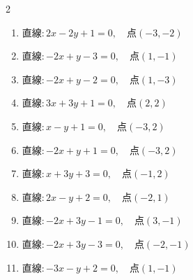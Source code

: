 \begin{multicols}{2}
\begin{enumerate}
  \item $直線:2x-2y+1=0,\quad 点 ( -3, -2 )$


\columnbreak %

  \item $直線:-2x+y-3=0,\quad 点 ( 1, -1 )$


  \item $直線:-2x+y-2=0,\quad 点 ( 1, -3 )$


  \item $直線:3x+3y+1=0,\quad 点 ( 2, 2 )$


  \item $直線:x-y+1=0,\quad 点 ( -3, 2 )$


  \item $直線:-2x+y+1=0,\quad 点 ( -3, 2 )$


  \item $直線:x+3y+3=0,\quad 点 ( -1, 2 )$


  \item $直線:2x-y+2=0,\quad 点 ( -2, 1 )$


  \item $直線:-2x+3y-1=0,\quad 点 ( 3, -1 )$


  \item $直線:-2x+3y-3=0,\quad 点 ( -2, -1 )$


  \item $直線:-3x-y+2=0,\quad 点 ( 1, -1 )$

        \phantom{$\displaystyle 距離 : 0$}

\columnbreak %

\resetques


\end{enumerate}
\end{multicols}
